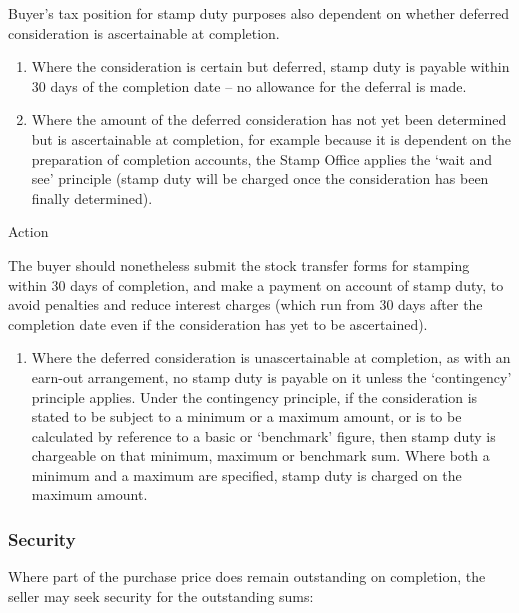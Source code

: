 \documentclass[
]{article}
\providecommand{\tightlist}{%
  \setlength{\itemsep}{0pt}\setlength{\parskip}{0pt}}
\newenvironment{env-a57f3fff-c46d-4aeb-b36c-ada0d8066098}
{
    \savenotes\tcolorbox[blanker,breakable,left=5pt,borderline west={2pt}{-4pt}{aquamarine}]
}
{
    \endtcolorbox\spewnotes
}
\begin{document}
Buyer's tax position for stamp duty purposes also dependent on whether
deferred consideration is ascertainable at completion.

\begin{enumerate}
\tightlist
\item
  Where the consideration is certain but deferred, stamp duty is payable
  within 30 days of the completion date -- no allowance for the deferral
  is made.
\item
  Where the amount of the deferred consideration has not yet been
  determined but is ascertainable at completion, for example because it
  is dependent on the preparation of completion accounts, the Stamp
  Office applies the `wait and see' principle (stamp duty will be
  charged once the consideration has been finally determined).
\end{enumerate}

\begin{env-a57f3fff-c46d-4aeb-b36c-ada0d8066098}

Action

The buyer should nonetheless submit the stock transfer forms for
stamping within 30 days of completion, and make a payment on account of
stamp duty, to avoid penalties and reduce interest charges (which run
from 30 days after the completion date even if the consideration has yet
to be ascertained).

\end{env-a57f3fff-c46d-4aeb-b36c-ada0d8066098}

\begin{enumerate}
\tightlist
\item
  Where the deferred consideration is unascertainable at completion, as
  with an earn-out arrangement, no stamp duty is payable on it unless
  the `contingency' principle applies. Under the contingency principle,
  if the consideration is stated to be subject to a minimum or a maximum
  amount, or is to be calculated by reference to a basic or `benchmark'
  figure, then stamp duty is chargeable on that minimum, maximum or
  benchmark sum. Where both a minimum and a maximum are specified, stamp
  duty is charged on the maximum amount.
\end{enumerate}

\hypertarget{security}{%
\subsubsection{Security}\label{security}}

Where part of the purchase price does remain outstanding on completion,
the seller may seek security for the outstanding sums:
\end{document}
